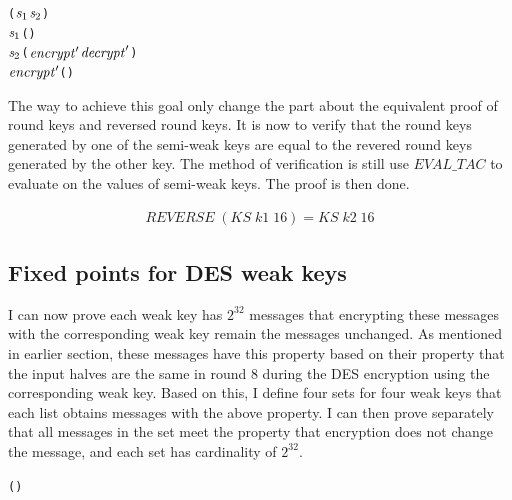 \documentclass{article}
\begin{document}
\begin{alltt}
   \HOLTokenTurnstile{}    \HOLSymConst{\HOLTokenConj{}}  \HOLSymConst{=} (\ensuremath{\HOLFreeVar{s}\sb{\mathrm{1}}}\HOLSymConst{,}\ensuremath{\HOLFreeVar{s}\sb{\mathrm{2}}}) \HOLSymConst{\HOLTokenConj{}}
    \ensuremath{\HOLFreeVar{s}\sb{\mathrm{1}}} \HOLSymConst{=} (\HOLSymConst{,}) \HOLSymConst{\HOLTokenConj{}}
    \ensuremath{\HOLFreeVar{s}\sb{\mathrm{2}}} \HOLSymConst{=} (\ensuremath{\HOLFreeVar{encrypt}\sp{\prime{}}}\HOLSymConst{,}\ensuremath{\HOLFreeVar{decrypt}\sp{\prime{}}}) \HOLSymConst{\HOLTokenImp{}}
   \ensuremath{\HOLFreeVar{encrypt}\sp{\prime{}}} ( ) \HOLSymConst{=} 
\end{alltt}

The way to achieve this goal only change the part about the equivalent proof of round keys and reversed round keys.
It is now to verify that the round keys generated by one of the semi-weak keys are equal to the revered round
keys generated by the other key. The method of verification is still use $EVAL\_TAC$ to evaluate on the values of semi-weak
keys. The proof is then done.

\begin{equation}
\begin{split}
 REVERSE \; (KS \; k1 \; 16)= KS \; k2 \; 16
\end{split}
\end{equation}

\subsection{Fixed points for DES weak keys}
I can now prove each weak key has $2^{32}$ messages that encrypting these messages with the corresponding weak key remain
the messages unchanged. As mentioned in earlier section, these messages have this property based on their property that
the input halves are the same in round 8 during the DES encryption using the corresponding weak key. Based on this, I define
four sets for four weak keys that each list obtains messages with the above property. I can then prove separately that
all messages in the set meet the property that encryption does not change the message, and each set has cardinality
of $2^{32}$.

\begin{alltt}
   \HOLTokenTurnstile{}  \HOLSymConst{\HOLTokenIn{}}  \HOLSymConst{\HOLTokenConj{}}   \HOLSymConst{=} (\HOLSymConst{,}) \HOLSymConst{\HOLTokenImp{}}
     \HOLSymConst{=} 
\end{alltt}
\end{document}
